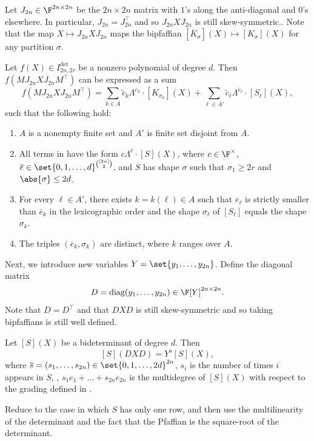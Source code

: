 \documentclass[letterpaper, 11pt]{amsart}
\begin{document}
Let $J_{2n} \in \F^{2n \times 2n}$ be the $2n \times 2n$ matrix with $1$'s along the anti-diagonal and $0$'s elsewhere.
In particular, $J_{2n} = J_{2n}^\top$ and so $J_{2n} X J_{2n}$ is still skew-symmetric..
Note that the map $X \mapsto J_{2n} X J_{2n}$ maps the bipfaffian $[\overline{K}_\sigma](X) \mapsto [K_\sigma](X)$ for any partition $\sigma$.
\begin{cor}\label{cor:reformulated_pfaff}
Let $f(X) \in I^{\det}_{2n, 2r}$ be a nonzero polynomial of degree $d$.
Then $f(M J_{2n} X J_{2n} M^\top)$ can be expressed as a sum
\begin{equation}\label{eq:expansion3_pfaff}
    f(M J_{2n} X J_{2n} M^\top) = \sum_{k \in A} \widetilde{c}_{k} \Lambda^{\overline{e}_k}\cdot [K_{\sigma_k}](X) + \sum_{\ell\in A'} \widetilde{c}_{\ell} \Lambda^{\overline{e}_\ell}\cdot [S_\ell](X),
\end{equation}
such that the following hold:
\begin{enumerate}
    \item\label{item:expansion3_i0_pfaff} $A$ is a nonempty finite set and $A'$ is finite set disjoint from $A$.
    \item\label{item:expansion3_i1_pfaff} All terms in  have the form $c \Lambda^{\overline{e}}\cdot [S](X)$, where $c\in \F^\times$, $\overline{e}\in \set{0,1,\dots,d}^{\binom{[2n]}{2}}$, and $S$ has shape $\sigma$ such that $\sigma_1 \geq 2r$ and $\abs{\sigma} \leq 2d$.
    \item\label{item:expansion3_i1.5_pfaff} For every $\ell\in A'$, there exists $k=k(\ell)\in A$ such that $\overline{e}_\ell$ is strictly smaller than $\overline{e}_k$ in the lexicographic order and the shape $\sigma_\ell$ of $[S_\ell]$ equals the shape $\sigma_k$.
    \item\label{item:expansion3_i2_pfaff} The triples $(\overline{e}_k,\sigma_k)$ are distinct, where $k$ ranges over $A$.
\end{enumerate} 
\end{cor}

Next, we introduce new variables $Y=\set{y_1,\dots,y_{2n}}$.
Define the diagonal matrix
\[
    D=\mathrm{diag}(y_1,\dots,y_{2n}) \in \F[Y]^{2n \times 2n}.
\]
Note that $D = D^\top$ and that $D X D$ is still skew-symmetric and so taking bipfaffians is still well defined.
\begin{lem}\label{lem:diagonals_pfaff}
Let $[S](X)$ be a bideterminant of degree $d$.
Then 
\[
    [S](D X D)= Y^{\overline{s}} [S](X),
\]
where $\overline{s}=(s_1,\dots,s_{2n})\in \set{0, 1, \dots, 2d}^{2n}$, $s_i$ is the number of times $i$ appears in $S$, \ie, $s_1 e_1+\dots+s_{2n} e_{2n}$ is the multidegree of $[S](X)$ with respect to the grading defined in .
\end{lem}
\begin{pf}
    Reduce to the case in which $S$ has only one row, and then use the multilinearity of the determinant and the fact that the Pfaffian is the square-root of the determinant.
\end{pf}
\end{document}
